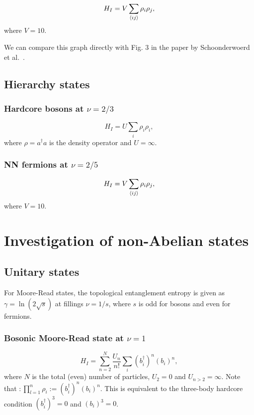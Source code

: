 \documentclass[floatfix,showpacs,amsmath,amsfonts,amssymb,aps,twocolumn, prb,groupedaddress]{revtex4-1}
\begin{document}
\begin{equation}
H_I = V \sum_{\braket{ij}} \rho_i \rho_j,
\end{equation}
where $V=10$.

We can compare this graph directly with Fig. 3 in the paper by Schoonderwoerd et al.~\cite{Schoonder19}.

\subsection{Hierarchy states}

\subsubsection{Hardcore bosons at $\nu=2/3$}

\begin{equation}
H_I = U \sum_i \rho_i \rho_i,
\end{equation}
where $\rho=a^\dagger a$ is the density operator and $U=\infty$.

\subsubsection{NN fermions at $\nu=2/5$}

\begin{equation}
H_I = V \sum_{\braket{ij}} \rho_i \rho_j,
\end{equation}
where $V=10$.

\section{Investigation of non-Abelian states}

\subsection{Unitary states}

For Moore-Read states, the topological entanglement entropy is given as $\gamma=\ln (2\sqrt{s})$ at fillings $\nu=1/s$, where $s$ is odd for bosons and even for fermions.~\cite{Glasser15}

\subsubsection{Bosonic Moore-Read state at $\nu=1$}

\begin{equation}
H_I = \sum_{n=2}^N \frac{U_n}{n!} \sum_{i} (b^\dagger_i)^n (b_i)^n,
\end{equation}
where $N$ is the total (even) number of particles, $U_2=0$ and $U_{n>2}=\infty$. Note that $:\prod_{l=1}^n \rho_i:=(b^\dagger_i)^n (b_i)^n$. This is equivalent to the three-body hardcore condition $(b^\dagger_i)^3=0$ and $(b_i)^3=0$.~\cite{Zhu15}
\end{document}
